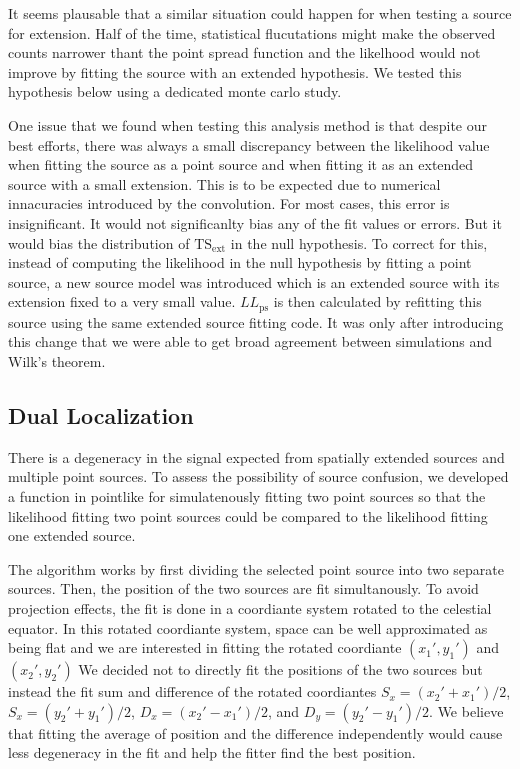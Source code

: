 \documentclass[preprint]{aastex}
\newcommand{\tsext}{\ensuremath{\text{TS}_\text{ext}}\xspace}
\begin{document}
It seems plausable that a similar situation could happen for when testing
a source for extension. Half of the time, statistical flucutations might
make the observed counts narrower thant the point spread function and
the likelhood would not improve by fitting the source with an extended
hypothesis. We tested this hypothesis below using a dedicated monte
carlo study.

One issue that we found when testing this analysis method is that
despite our best efforts, there was always a small discrepancy between
the likelihood value when fitting the source as a point source and when
fitting it as an extended source with a small extension.  This is to be
expected due to numerical innacuracies introduced by the convolution.
For most cases, this error is insignificant. It would not significanlty
bias any of the fit values or errors. But it would bias the distribution
of $\tsext$ in the null hypothesis. To correct for this,
instead of computing the likelihood in the null hypothesis by fitting
a point source, a new source model was introduced which is an extended
source with its extension fixed to a very small value. $LL_\text{ps}$
is then calculated by refitting this source using the same extended
source fitting code. It was only after introducing this change that we
were able to get broad agreement between simulations and Wilk's theorem.



\subsection{Dual Localization}

There is a degeneracy in the signal expected from spatially extended
sources and multiple point sources.  To assess the possibility of source
confusion, we developed a function in pointlike for simulatenously fitting
two point sources so that the likelihood fitting two point sources
could be compared to the likelihood fitting one extended source.

The algorithm works by first dividing the selected point source into
two separate sources. Then, the position of the two sources 
are fit simultanously. To avoid projection effects, the fit is
done in a coordiante system rotated to the celestial equator.
In this rotated coordiante system, space can be well approximated
as being flat and we are interested in fitting the 
rotated coordiante $(x_1',y_1')$ and $(x_2',y_2')$
We decided not to directly fit the positions of the two sources 
but instead the fit sum and difference of the rotated coordiantes
$S_x=(x_2'+x_1')/2$, $S_x=(y_2'+y_1')/2$, $D_x=(x_2'-x_1')/2$, and $D_y=(y_2'-y_1')/2$.
We believe that fitting the average of position and the difference
independently would cause less degeneracy in the fit and help the fitter
find the best position.
\end{document}
